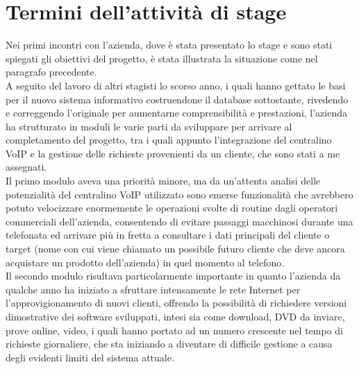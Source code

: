 \section{Termini dell'attivit\` a di stage}
Nei primi incontri con l'azienda, dove \` e stata presentato lo stage e sono stati spiegati gli obiettivi del progetto, \` e stata illustrata la situazione come nel paragrafo precedente. \\
A seguito del lavoro di altri stagisti lo scorso anno, i quali hanno gettato le basi per il nuovo sistema informativo costruendone il database sottostante, rivedendo e correggendo l'originale per aumentarne comprensibilit\` a e prestazioni, l'azienda ha strutturato in moduli le varie parti da sviluppare per arrivare al completamento del progetto, tra i quali appunto l'integrazione del centralino VoIP e la gestione delle richieste provenienti da un cliente, che sono stati a me assegnati. \\
Il primo modulo aveva una priorit\` a minore, ma da un'attenta analisi delle potenzialit\` a del centralino VoIP utilizzato sono emerse funzionalit\` a che avrebbero potuto velocizzare enormemente le operazioni svolte di routine dagli operatori commerciali dell'azienda, consentendo di evitare passaggi macchinosi durante una telefonata ed arrivare pi\` u in fretta a consultare i dati principali del cliente o target (nome con cui viene chiamato un possibile futuro cliente che deve ancora acquistare un prodotto dell'azienda) in quel momento al telefono.\\
Il secondo modulo risultava particolarmente importante in quanto l'azienda da qualche anno ha iniziato a sfruttare intensamente le rete Internet per l'approvigionamento di nuovi clienti, offrendo la possibilit\` a di richiedere versioni dimostrative dei software sviluppati, intesi sia come download, DVD da inviare, prove online, video, i quali hanno portato ad un numero crescente nel tempo di richieste giornaliere, che sta iniziando a diventare di difficile gestione a causa degli evidenti limiti del sistema attuale. 

